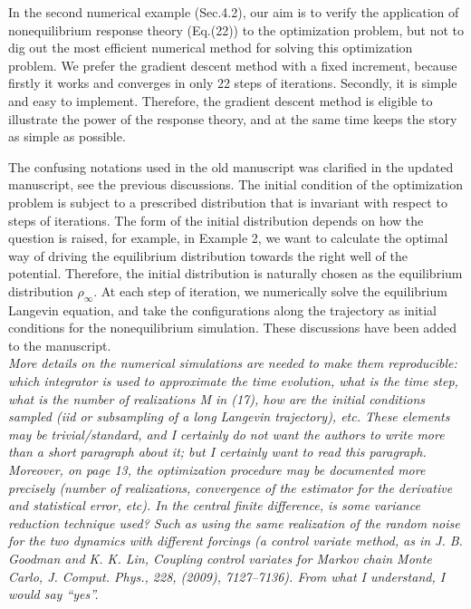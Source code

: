 \documentclass[]{revtex4-1}
\begin{document}
In the second numerical example (Sec.4.2), our aim is to verify the
application of nonequilibrium response theory (Eq.(22)) to the
optimization problem, but not to dig out the most efficient numerical
method for solving this optimization problem.  We prefer the
gradient descent method with a fixed increment, because firstly it
works and converges in only 22 steps of iterations. Secondly,
it is simple and easy to implement. Therefore, the gradient descent
method is eligible to illustrate the power of the response theory, and
at the same time keeps the story as simple as possible.

The confusing notations used in the old manuscript was clarified
in the updated manuscript, see the previous discussions.
The initial condition of the optimization problem is subject to
a prescribed distribution that is invariant with respect
to steps of iterations. The form of the initial distribution
depends on how the question is raised, for example, in Example 2,
we want to  calculate the optimal way of driving the
equilibrium distribution towards the right well of the potential.
Therefore, the initial distribution is naturally chosen as the
equilibrium distribution $\rho_\infty$.
At each step of iteration, we numerically solve the
equilibrium Langevin equation,
and take the configurations along the trajectory as initial conditions
for the nonequilibrium simulation.
These discussions have been added to the manuscript.
\\

\emph{ More details on the numerical simulations are needed to make
  them reproducible: which integrator is used to approximate the time
  evolution, what is the time step, what is the number of realizations
  M in (17), how are the initial conditions sampled (iid or
  subsampling of a long Langevin trajectory), etc. These elements may
  be trivial/standard, and I certainly do not want the authors to
  write more than a short paragraph about it; but I certainly want to
  read this paragraph. Moreover, on page 13, the optimization
  procedure may be documented more precisely (number of realizations,
  convergence of the estimator for the derivative and statistical
  error, etc). In the central finite difference, is some variance
  reduction technique used? Such as using the same realization of the
  random noise for the two dynamics with different forcings (a control
  variate method, as in J. B. Goodman and K. K. Lin, Coupling control
  variates for Markov chain Monte Carlo, J. Comput. Phys., 228,
  (2009), 7127–7136).  From what I understand, I would say ``yes''.  }\\
\end{document}
